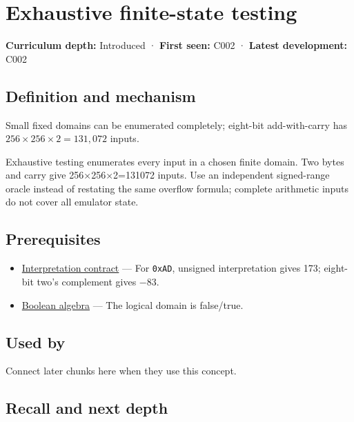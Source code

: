 \hypertarget{appendix-05db24ccc28a}{}
\section{Exhaustive finite-state testing}\label{appendix-05db24ccc28a-exhaustive-finite-state-testing}

\textbf{Curriculum depth:} Introduced · \textbf{First seen:} C002 · \textbf{Latest development:} C002

\subsection{Definition and mechanism}\label{appendix-05db24ccc28a-definition-and-mechanism}

Small fixed domains can be enumerated completely; eight-bit add-with-carry has \(256\times256\times2=131{,}072\) inputs.

Exhaustive testing enumerates every input in a chosen finite domain. Two bytes and carry give 256×256×2=131072 inputs. Use an independent signed-range oracle instead of restating the same overflow formula; complete arithmetic inputs do not cover all emulator state.

\subsection{Prerequisites}\label{appendix-05db24ccc28a-prerequisites}

\begin{itemize}
\tightlist
\item
  \hyperref[appendix-f414bd4ed05c]{Interpretation contract} --- For \texttt{0xAD}, unsigned interpretation gives 173; eight-bit two's complement gives −83.
\item
  \hyperref[appendix-24475e1596a8]{Boolean algebra} --- The logical domain is false/true.
\end{itemize}

\subsection{Used by}\label{appendix-05db24ccc28a-used-by}

Connect later chunks here when they use this concept.

\subsection{Recall and next depth}\label{appendix-05db24ccc28a-recall-and-next-depth}

